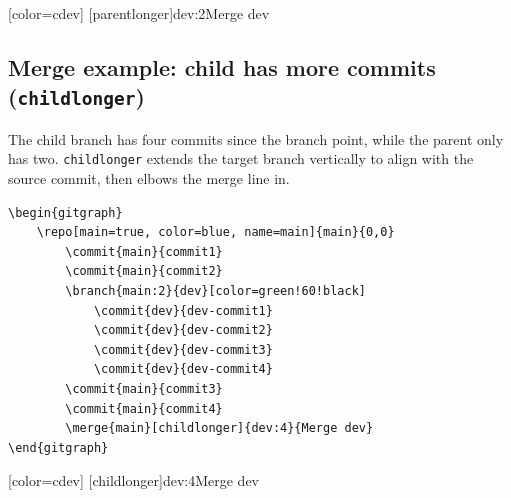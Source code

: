 \documentclass{article}
\newcommand{\opt}[1]{\texttt{#1}}
\begin{document}
            \begin{center}
                \begin{gitgraph}
                    [color=cdev]
                    [parentlonger]{dev:2}{Merge dev}
                \end{gitgraph}
            \end{center}

        \subsection{Merge example: child has more commits (\opt{childlonger})}

            The child branch has four commits since the branch point, while the parent only has two.
            \opt{childlonger} extends the target branch vertically to align with the source commit, then elbows the merge line in.

            \begin{verbatim}
\begin{gitgraph}
    \repo[main=true, color=blue, name=main]{main}{0,0}
        \commit{main}{commit1}
        \commit{main}{commit2}
        \branch{main:2}{dev}[color=green!60!black]
            \commit{dev}{dev-commit1}
            \commit{dev}{dev-commit2}
            \commit{dev}{dev-commit3}
            \commit{dev}{dev-commit4}
        \commit{main}{commit3}
        \commit{main}{commit4}
        \merge{main}[childlonger]{dev:4}{Merge dev}
\end{gitgraph}
            \end{verbatim}

            \begin{center}
                \begin{gitgraph}
                        [color=cdev]
                        [childlonger]{dev:4}{Merge dev}
                \end{gitgraph}
            \end{center}
\end{document}
